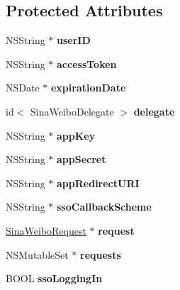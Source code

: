 \subsection*{Protected Attributes}
\begin{DoxyCompactItemize}
\item 
\mbox{\label{interfaceSinaWeibo_a4198c5548a8ff3eb14027d96df0d9fb5}} 
N\+S\+String $\ast$ {\bfseries user\+ID}
\item 
\mbox{\label{interfaceSinaWeibo_a7b51907b184bb635c49053055612dc4b}} 
N\+S\+String $\ast$ {\bfseries access\+Token}
\item 
\mbox{\label{interfaceSinaWeibo_abf4a95c9959a894297e8b200cafab6e9}} 
N\+S\+Date $\ast$ {\bfseries expiration\+Date}
\item 
\mbox{\label{interfaceSinaWeibo_a7fb4c08759d9ed53ea913842bff39882}} 
id$<$ Sina\+Weibo\+Delegate $>$ {\bfseries delegate}
\item 
\mbox{\label{interfaceSinaWeibo_aa4814b1bbfe28cd46ddce60758433cdc}} 
N\+S\+String $\ast$ {\bfseries app\+Key}
\item 
\mbox{\label{interfaceSinaWeibo_afae59fb8183098cb7aa55ec3af55afb1}} 
N\+S\+String $\ast$ {\bfseries app\+Secret}
\item 
\mbox{\label{interfaceSinaWeibo_a9c1e112e3ba42591e04f54c3a0d8fc17}} 
N\+S\+String $\ast$ {\bfseries app\+Redirect\+U\+RI}
\item 
\mbox{\label{interfaceSinaWeibo_aced10a7bb64fb19b8a043c01d4406683}} 
N\+S\+String $\ast$ {\bfseries sso\+Callback\+Scheme}
\item 
\mbox{\label{interfaceSinaWeibo_ae1db8c370b3b9fcf1e7953bed735a0cd}} 
\hyperlink{interfaceSinaWeiboRequest}{Sina\+Weibo\+Request} $\ast$ {\bfseries request}
\item 
\mbox{\label{interfaceSinaWeibo_a83cac96b18b9abcca991c7c0609c5329}} 
N\+S\+Mutable\+Set $\ast$ {\bfseries requests}
\item 
\mbox{\label{interfaceSinaWeibo_a61c6088a9b2af15fb7ec1075250904c6}} 
B\+O\+OL {\bfseries sso\+Logging\+In}
\end{DoxyCompactItemize}
